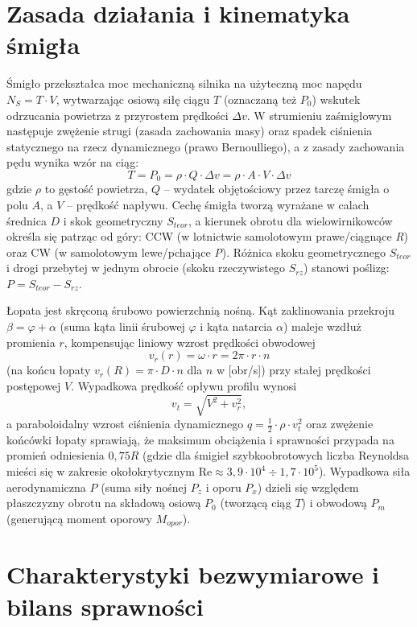 \section*{Zasada działania i kinematyka śmigła}

\akapit Śmigło przekształca moc mechaniczną silnika na użyteczną moc napędu $N_S = T \cdot V$, wytwarzając osiową siłę ciągu $T$ (oznaczaną też $P_0$) wskutek odrzucania powietrza z przyrostem prędkości $\Delta v$. W strumieniu zaśmigłowym następuje zwężenie strugi (zasada zachowania masy) oraz spadek ciśnienia statycznego na rzecz dynamicznego (prawo Bernoulliego), a z zasady zachowania pędu wynika wzór na ciąg:
\[
T = P_0 = \rho \cdot Q \cdot \Delta v = \rho \cdot A \cdot V \cdot \Delta v
\]
gdzie $\rho$ to gęstość powietrza, $Q$ -- wydatek objętościowy przez tarczę śmigła o polu $A$, a $V$ -- prędkość napływu. Cechę śmigła tworzą wyrażane w calach średnica $D$ i skok geometryczny $S_{teor}$, a kierunek obrotu dla wielowirnikowców określa się patrząc od góry: CCW (w lotnictwie samolotowym prawe/ciągnące \textit{R}) oraz CW (w samolotowym lewe/pchające \textit{P}). Różnica skoku geometrycznego $S_{teor}$ i drogi przebytej w jednym obrocie (skoku rzeczywistego $S_{rz}$) stanowi poślizg: $P = S_{teor} - S_{rz}$.

\akapit Łopata jest skręconą śrubowo powierzchnią nośną. Kąt zaklinowania przekroju $\beta = \varphi + \alpha$ (suma kąta linii śrubowej $\varphi$ i kąta natarcia $\alpha$) maleje wzdłuż promienia $r$, kompensując liniowy wzrost prędkości obwodowej
\[
v_r(r) = \omega \cdot r = 2\pi \cdot r \cdot n
\]
(na końcu łopaty $v_r(R) = \pi \cdot D \cdot n$ dla $n$ w [obr/s]) przy stałej prędkości postępowej $V$. Wypadkowa prędkość opływu profilu wynosi
\[
v_t = \sqrt{V^2 + v_r^2},
\]
a paraboloidalny wzrost ciśnienia dynamicznego $q = \tfrac{1}{2} \cdot \rho \cdot v_t^2$ oraz zwężenie końcówki łopaty sprawiają, że maksimum obciążenia i sprawności przypada na promień odniesienia $0{,}75R$ (gdzie dla śmigieł szybkoobrotowych liczba Reynoldsa mieści się w zakresie okołokrytycznym $\mathrm{Re} \approx 3{,}9\cdot 10^{4} \div 1{,}7\cdot 10^{5}$). Wypadkowa siła aerodynamiczna $P$ (suma siły nośnej $P_z$ i oporu $P_x$) dzieli się względem płaszczyzny obrotu na składową osiową $P_0$ (tworzącą ciąg $T$) i obwodową $P_m$ (generującą moment oporowy $M_{opor}$).

\section*{Charakterystyki bezwymiarowe i bilans sprawności}

